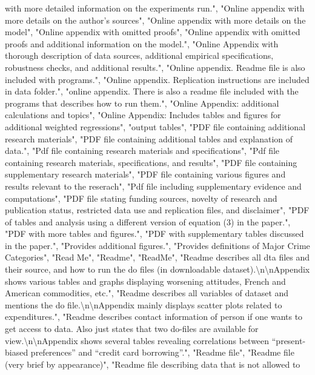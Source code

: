 \documentclass[]{article}
\begin{document}
\begin{itemize}
  with more detailed information on the experiments run.", "Online
  appendix with more details on the author's sources", "Online appendix
  with more details on the model", "Online appendix with omitted
  proofs", "Online appendix with omitted proofs and additional
  information on the model.", "Online Appendix with thorough description
  of data sources, additional empirical specifications, robustness
  checks, and additional results.", "Online appendix. Readme file is
  also included with programs.", "Online appendix. Replication
  instructions are included in data folder.", "online appendix. There is
  also a readme file included with the programs that describes how to
  run them.", "Online Appendix: additional calculations and topics",
  "Online Appendix: Includes tables and figures for additional weighted
  regressions", "output tables", "PDF file containing additional
  research materials", "PDF file containing additional tables and
  explanation of data.", "Pdf file containing research materials and
  specifications", "Pdf file containing research materials,
  specifications, and results", "PDF file containing supplementary
  research materials", "PDF file containing various figures and results
  relevant to the reserach", "Pdf file including supplementary evidence
  and computations", "PDF file stating funding sources, novelty of
  research and publication status, restricted data use and replication
  files, and disclaimer", "PDF of tables and analysis using a different
  version of equation (3) in the paper.", "PDF with more tables and
  figures.", "PDF with supplementary tables discussed in the paper.",
  "Provides additional figures.", "Provides definitions of Major Crime
  Categories", "Read Me", "Readme", "ReadMe", "Readme describes all dta
  files and their source, and how to run the do files (in downloadable
  dataset).\textbackslash{}n\textbackslash{}nAppendix shows various
  tables and graphs displaying worsening attitudes, French and American
  commodities, etc.", "Readme describes all variables of dataset and
  mentions the do file.\textbackslash{}n\textbackslash{}nAppendix mainly
  displays scatter plots related to expenditures.", "Readme describes
  contact information of person if one wants to get access to data. Also
  just states that two do-files are available for
  view.\textbackslash{}n\textbackslash{}nAppendix shows several tables
  revealing correlations between ``present-biased preferences'' and
  ``credit card borrowing''.", "Readme file", "Readme file (very brief
  by appearance)", "Readme file describing data that is not allowed to

\end{itemize}
\end{document}
